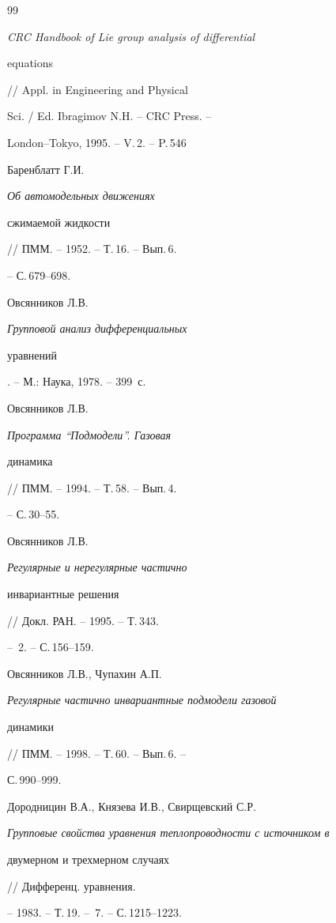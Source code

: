 \begin{thebibliography}{99} 


 




{\em CRC Handbook of Lie group analysis of differential 


equations} // Appl. in Engineering and Physical 


Sci. / Ed. Ibragimov N.H. -- CRC Press. -- 


London--Tokyo, 1995. -- V.\,2. -- P.\,546 




Баренблатт Г.И. {\em Об автомодельных движениях 


сжимаемой жидкости} // ПММ. -- 1952. -- Т.\,16. -- Вып.\,6. 


-- С.\,679--698. 




Овсянников Л.В. {\em Групповой анализ дифференциальных 


уравнений}. -- М.: Наука, 1978. -- 399~с. 




Овсянников Л.В. {\em Программа ``Подмодели''. Газовая 


динамика} // ПММ. -- 1994. -- Т.\,58. -- Вып.\,4. 


-- С.\,30--55. 




Овсянников Л.В. {\em Регулярные и нерегулярные частично 


инвариантные решения} // Докл. РАН. -- 1995. -- Т.\,343. 


-- \No\,2. -- С.\,156--159. 




Овсянников Л.В., Чупахин А.П. 


{\em Регулярные частично инвариантные подмодели газовой 


динамики} // ПММ. -- 1998. -- Т.\,60. -- Вып.\,6. -- 


С.\,990--999. 




Дородницин В.А., Князева И.В., Свирщевский С.Р. 


{\em Групповые свойства уравнения теплопроводности с источником в 


двумерном и трехмерном случаях} // Дифференц. уравнения. 


-- 1983. -- Т.\,19. -- \No\,7. -- С.\,1215--1223. 



\end{thebibliography}
